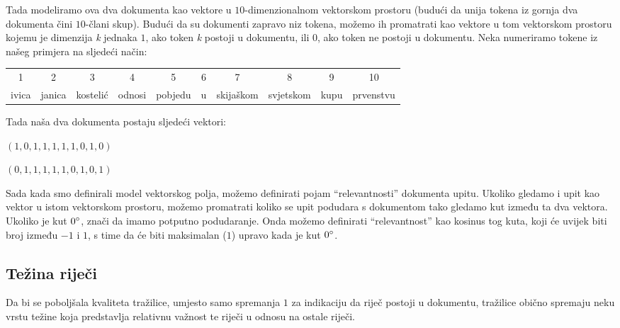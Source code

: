 \documentclass[a4paper,twoside,12pt]{scrreprt}
\begin{document}
Tada modeliramo ova dva dokumenta kao vektore u $10$-dimenzionalnom vektorskom prostoru (budući da unija tokena iz gornja dva dokumenta čini $10$-člani skup). Budući da su dokumenti zapravo niz tokena, možemo ih promatrati kao vektore u tom vektorskom prostoru kojemu je dimenzija \textit{k} jednaka $1$, ako token \textit{k} postoji u dokumentu, ili $0$, ako token ne postoji u dokumentu. Neka numeriramo tokene iz našeg primjera na sljedeći način:

\begin{center}
  \begin{tabular}{@{\enspace}c@{\enspace}c@{\enspace}c@{\enspace}c@{\enspace}c@{\enspace}c@{\enspace}c@{\enspace}c@{\enspace}c@{\enspace}c@{\enspace}}
    1     & 2      & 3        & 4      & 5       & 6 & 7         & 8         & 9    & 10        \\
    ivica & janica & kostelić & odnosi & pobjedu & u & skijaškom & svjetskom & kupu & prvenstvu \\
  \end{tabular}
\end{center}

Tada naša dva dokumenta postaju sljedeći vektori:

\begin{compactenum}
  \item $(1,0,1,1,1,1,1,0,1,0)$
  \item $(0,1,1,1,1,1,0,1,0,1)$
\end{compactenum}

Sada kada smo definirali model vektorskog polja, možemo definirati pojam ``relevantnosti'' dokumenta upitu. Ukoliko gledamo i upit kao vektor u istom vektorskom prostoru, možemo promatrati koliko se upit podudara s dokumentom tako gledamo kut između ta dva vektora. Ukoliko je kut $0\degree$, znači da imamo potputno podudaranje. Onda možemo definirati ``relevantnost'' kao kosinus tog kuta, koji će uvijek biti broj između $-1$ i $1$, s time da će biti maksimalan ($1$) upravo kada je kut $0\degree$.

\subsection{Težina riječi}
\label{tfidf}

Da bi se poboljšala kvaliteta tražilice, umjesto samo spremanja $1$ za indikaciju da riječ postoji u dokumentu, tražilice obično spremaju neku vrstu težine koja predstavlja relativnu važnost te riječi u odnosu na ostale riječi.
\end{document}
